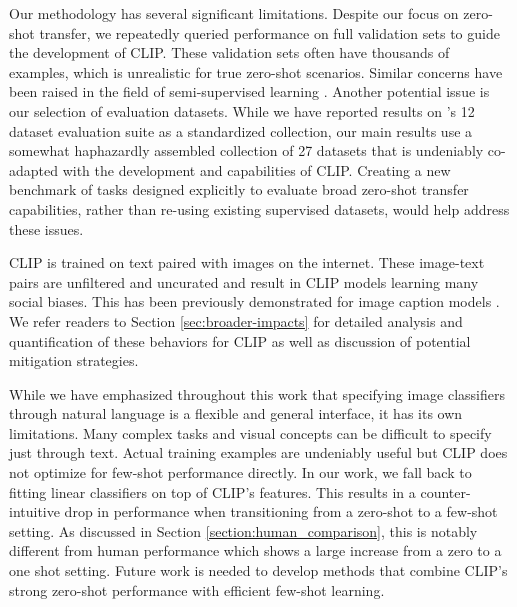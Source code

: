Our methodology has several significant limitations. Despite our focus on zero-shot transfer, we repeatedly queried performance on full validation sets to guide the development of CLIP. These validation sets often have thousands of examples, which is unrealistic for true zero-shot scenarios. Similar concerns have been raised in the field of semi-supervised learning \citep{oliver2018realistic}. Another potential issue is our selection of evaluation datasets. While we have reported results on \citet{kornblith2019better}'s 12 dataset evaluation suite as a standardized collection, our main results use a somewhat haphazardly assembled collection of 27 datasets that is undeniably co-adapted with the development and capabilities of CLIP. Creating a new benchmark of tasks designed explicitly to evaluate broad zero-shot transfer capabilities, rather than re-using existing supervised datasets, would help address these issues.

CLIP is trained on text paired with images on the internet. These image-text pairs are unfiltered and uncurated and result in CLIP models learning many social biases. This has been previously demonstrated for image caption models \citep{bhargava2019exposing}. We refer readers to Section \ref{sec:broader-impacts} for detailed analysis and quantification of these behaviors for CLIP as well as discussion of potential mitigation strategies.

While we have emphasized throughout this work that specifying image classifiers through natural language is a flexible and general interface, it has its own limitations. Many complex tasks and visual concepts can be difficult to specify just through text. Actual training examples are undeniably useful but CLIP does not optimize for few-shot performance directly. In our work, we fall back to fitting linear classifiers on top of CLIP's features. This results in a counter-intuitive drop in performance when transitioning from a zero-shot to a few-shot setting. As discussed in Section \ref{section:human_comparison}, this is notably different from human performance which shows a large increase from a zero to a one shot setting. Future work is needed to develop methods that combine CLIP's strong zero-shot performance with efficient few-shot learning.

